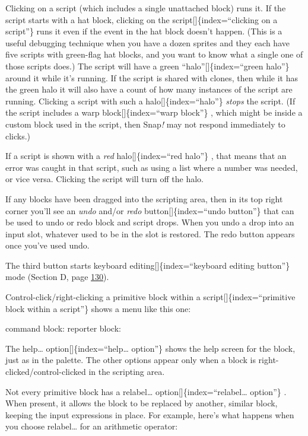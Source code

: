 \documentclass[
  letterpaper,
]{book}
\begin{document}
Clicking on a script (which includes a single unattached block) runs it.
If the script starts with a hat block, clicking on the
script{[}{]}\{index=``clicking on a script''\} runs it even if the event
in the hat block doesn't happen. (This is a useful debugging technique
when you have a dozen sprites and they each have five scripts with
green-flag hat blocks, and you want to know what a single one of those
scripts does.) The script will have a green
``halo''{[}{]}\{index=``green halo''\} around it while it's running. If
the script is shared with clones, then while it has the green halo it
will also have a count of how many instances of the script are running.
Clicking a script with such a halo{[}{]}\{index=``halo''\} \emph{stops}
the script. (If the script includes a warp block{[}{]}\{index=``warp
block''\} , which might be inside a custom block used in the script,
then Snap\emph{!} may not respond immediately to clicks.)

If a script is shown with a \emph{red} halo{[}{]}\{index=``red halo''\}
, that means that an error was caught in that script, such as using a
list where a number was needed, or vice versa. Clicking the script will
turn off the halo.

If any blocks have been dragged into the scripting area, then in its top
right corner you'll see an \emph{undo} and/or \emph{redo}
button{[}{]}\{index=``undo button''\} that can be used to undo or redo
block and script drops. When you undo a drop into an input slot,
whatever used to be in the slot is restored. The redo button appears
once you've used undo.

The third button starts keyboard editing{[}{]}\{index=``keyboard editing
button''\} mode (Section D, page \hyperref[keyboard-editing]{130}).

Control-click/right-clicking a primitive block within a
script{[}{]}\{index=``primitive block within a script''\} shows a menu
like this one:

command block: reporter block:

The help\ldots{} option{[}{]}\{index=``help\ldots{} option''\} shows the
help screen for the block, just as in the palette. The other options
appear only when a block is right-clicked/control-clicked in the
scripting area.

Not every primitive block has a relabel\ldots{}
option{[}{]}\{index=``relabel\ldots{} option''\} . When present, it
allows the block to be replaced by another, similar block, keeping the
input expressions in place. For example, here's what happens when you
choose relabel\ldots{} for an arithmetic operator:
\end{document}
